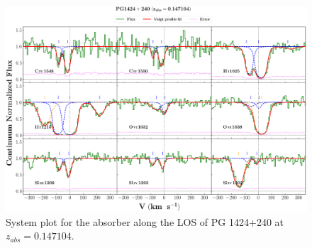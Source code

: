   
  \newpage
  
  
  \begin{landscape}
  
      \begin{figure}
      \centering
      \vspace{-20mm}
      \hspace*{-35mm}
      \includegraphics[width=1.25\linewidth]{System-Plots/PG1424+240_z=0.147104_sys_plot.png}
      \caption{System plot for the absorber along the LOS of PG 1424+240 at $z_{abs} = 0.147104$. }
      \end{figure}
      
  \end{landscape}
  
